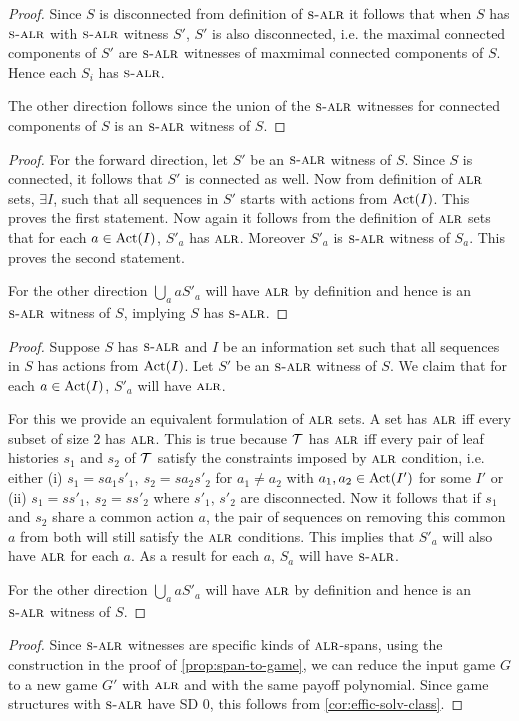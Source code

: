 \salrDisc*
\begin{proof}
Since $S$ is disconnected from definition of $\textsc{s-alr}$ it follows that when $S$ has $\textsc{s-alr}$ with $\textsc{s-alr}$ witness $S'$, $S'$ is also disconnected, i.e. the maximal connected components of $S'$ are $\textsc{s-alr}$ witnesses of maxmimal connected components of $S$. Hence each $S_i$ has $\textsc{s-alr}$.

The other direction follows since the union of the $\textsc{s-alr}$ witnesses for connected components of $S$ is an $\textsc{s-alr}$ witness of $S$. 
\end{proof}
\commonact*
\begin{proof}
For the forward direction, let $S'$ be an $\textsc{s-alr}$ witness of $S$. Since $S$ is connected, it follows that $S'$ is connected as well. Now from definition of $\textsc{alr}$ sets, $\exists I$, such that all sequences in $S'$ starts with actions from $\operatorname{Act}(I)$. This proves the first statement. 
Now again it follows from the definition of $\textsc{alr}$ sets that for each $a \in \operatorname{Act}(I)$, $S'_a$ has $\textsc{alr}$. Moreover $S'_a$ is $\textsc{s-alr}$ witness of $S_a$. This proves the second statement. 

For the other direction $\bigcup_a aS'_a$ will have $\textsc{alr}$ by definition and hence is an $\textsc{s-alr}$ witness of $S$, implying $S$ has $\textsc{s-alr}$.   
\end{proof}
\salrPtime*
\begin{proof}
Suppose $S$ has $\textsc{s-alr}$ and $I$ be an information set such that all sequences in $S$ has actions from $\operatorname{Act}(I)$. Let $S'$ be an $\textsc{s-alr}$ witness of $S$. We claim that for each $a \in \operatorname{Act}(I)$, $S'_a$ will have $\textsc{alr}$. 

For this we provide an equivalent formulation of $\textsc{alr}$ sets. A set has $\textsc{alr}$ iff every subset of size $2$ has $\textsc{alr}$. This is true because $\mathcal{T}$ has $\textsc{alr}$ iff every pair of leaf histories $s_1$ and $s_2$ of $\mathcal{T}$ satisfy the constraints imposed by $\textsc{alr}$ condition, i.e. either (i) $s_1 = sa_1s'_1,~ s_2 = sa_2s'_2$ for $a_1 \neq a_2$ with $a_1,a_2 \in \operatorname{Act}(I')$ for some $I'$ or (ii)  $s_1 = ss'_1,~ s_2 = ss'_2$ where $s'_1$, $s'_2$ are disconnected. Now it follows that if $s_1$ and $s_2$ share a common action $a$, the pair of sequences on removing this common $a$ from both will still satisfy the $\textsc{alr}$ conditions. This implies that $S'_a$ will also have $\textsc{alr}$ for each $a$. As a result for each $a$, $S_a$ will have $\textsc{s-alr}$.

For the other direction $\bigcup_a aS'_a$ will have $\textsc{alr}$ by definition and hence is an $\textsc{s-alr}$ witness of $S$.  
\end{proof}
\onepShufflePtime*
\begin{proof}
Since $\textsc{s-alr}$ witnesses are specific kinds of $\textsc{alr}$-spans, using the construction in the proof of \cref{prop:span-to-game}, we can reduce the input game $G$ to a new game $G'$ with $\textsc{alr}$ and with the same payoff polynomial. Since game structures with $\textsc{s-alr}$ have SD $0$, this follows from \cref{cor:effic-solv-class}. 
\end{proof}

